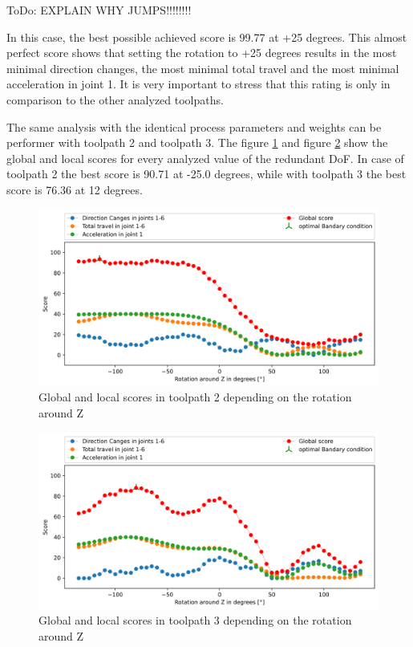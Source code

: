 ToDo: EXPLAIN WHY JUMPS!!!!!!!!\newline

In this case, the best possible achieved score is 99.77 at +25 degrees. This almost perfect score shows that setting the rotation to +25 degrees results in the most minimal direction changes, the most minimal total travel and the most minimal acceleration in joint 1. It is very important to stress that this rating is only in comparison to the other analyzed toolpaths.

The same analysis with the identical process parameters and weights can be performer with toolpath 2 and toolpath 3. The figure \ref{TP2_combi} and figure \ref{TP3_combi} show the global and local scores for every analyzed value of the redundant DoF. In case of toolpath 2 the best score is 90.71 at -25.0 degrees, while with toolpath 3 the best score is 76.36 at 12 degrees.



\begin{figure}[H]
\centerline{\includegraphics[width=1\textwidth]{figures/best_c_2_combi.png}}
\caption{Global and local scores in toolpath 2 depending on the rotation around Z}
\label{TP2_combi}
\end{figure}
\begin{figure}[H]
\centerline{\includegraphics[width=1\textwidth]{figures/best_c_3_combi.png}}
\caption{Global and local scores in toolpath 3 depending on the rotation around Z}
\label{TP3_combi}
\end{figure}

